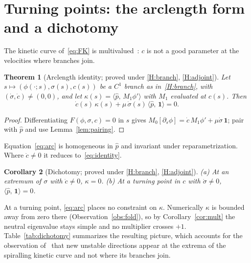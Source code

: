 \documentclass[11pt]{article}
\theoremstyle{plain}
\newtheorem{theorem}{Theorem}[section]
\newtheorem{corollary}[theorem]{Corollary}
\theoremstyle{definition}
\theoremstyle{remark}
\newcommand{\ip}[2]{\langle #1,\,#2\rangle}
\newcommand{\ph}{\hat p}
\newcommand{\one}{\mathbf 1}
\newcommand{\tagC}[1]{\textsf{proved under #1}}
\begin{document}
\section{Turning points: the arclength form and a dichotomy}\label{sec:folds}

The kinetic curve of~\eqref{eq:FK} is multivalued~\cite{VCKX20}: $c$ is not a good
parameter at the velocities where branches join.

\begin{theorem}[Arclength identity; \tagC{\ref{H:branch}, \ref{H:adjoint}}]\label{thm:arc}
Let $s\mapsto(\phi(\cdot;s),\sigma(s),c(s))$ be a $C^1$ branch as in~\ref{H:branch}, with
$(\dot\sigma,\dot c)\neq(0,0)$, and let $\kappa(s)=\ip{\ph}{M_1\phi'}$ with $M_1$ evaluated at
$c(s)$. Then
\begin{equation}\label{eq:arc}
  \dot c(s)\,\kappa(s)+\mu\,\dot\sigma(s)\,\ip{\ph}{\one}=0 .
\end{equation}
\end{theorem}

\begin{proof}
Differentiating $F(\phi,\sigma,c)=0$ in $s$ gives
$M_0[\partial_s\phi]=\dot c\,M_1\phi'+\mu\dot\sigma\,\one$; pair with $\ph$ and use
Lemma~\ref{lem:pairing}.
\end{proof}

Equation~\eqref{eq:arc} is homogeneous in $\ph$ and invariant under reparametrization.
Where $\dot c\neq0$ it reduces to~\eqref{eq:identity}.

\begin{corollary}[Dichotomy; \tagC{\ref{H:branch}, \ref{H:adjoint}}]\label{cor:dichotomy}
(a) At an extremum of $\sigma$ with $\dot c\neq0$, $\kappa=0$. (b) At a turning point in $c$
with $\dot\sigma\neq0$, $\ip{\ph}{\one}=0$.
\end{corollary}

At a turning point, \eqref{eq:arc} places no constraint on $\kappa$. Numerically $\kappa$
is bounded away from zero there (Observation~\ref{obs:fold}), so by
Corollary~\ref{cor:mult} the neutral eigenvalue stays simple and no multiplier crosses
$+1$. Table~\ref{tab:dichotomy} summarizes the resulting picture, which accounts for the
observation of~\cite{VCKX20} that new unstable directions appear at the extrema of the
spiralling kinetic curve and not where its branches join.
\end{document}
